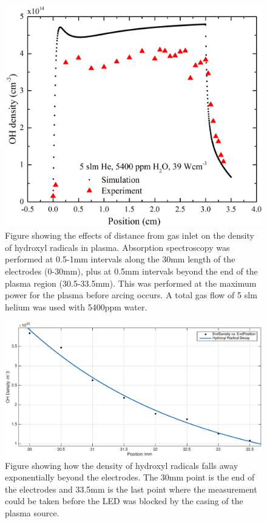 \documentclass[11pt, oneside]{article}   	%
\begin{document}
\begin{figure}
    \centering
    \includegraphics[width=\textwidth]{Figures/OHSpatialwithSim.jpg}
    \caption{Figure showing the effects of distance from gas inlet on the density of hydroxyl radicals in plasma. Absorption spectroscopy was performed at 0.5-1mm intervals along the 30mm length of the electrodes (0-30mm), plus at 0.5mm intervals beyond the end of the plasma region (30.5-33.5mm). This was performed at the maximum power for the plasma before arcing occurs. A total gas flow of 5 slm helium was used with 5400ppm water.}
    \label{fig:SpatialRes}
\end{figure}

\begin{figure}
	\centering
	\includegraphics[width=\textwidth]{Figures/OHdecay.eps}
	\caption{Figure showing how the density of hydroxyl radicals falls away exponentially beyond the electrodes. The 30mm point is the end of the electrodes and 33.5mm is the last point where the measurement could be taken before the LED was blocked by the casing of the plasma source.}
	\label{fig:OH decay}
\end{figure}
\end{document}

